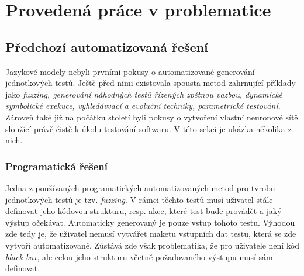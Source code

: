 \documentclass[czech, ma, kiv, he, iso690alph, pdf, viewonly]{fasthesis}
\begin{document}
    \section{Provedená práce v problematice} \label{sec:previouswork}
        \subsection{Předchozí automatizovaná řešení}
        Jazykové modely nebyli prvními pokusy o automatizované generování jednotkových testů. Ještě před nimi existovala spousta metod zahrnující příklady jako \textit{fuzzing, generování náhodných testů řízených zpětnou vazbou, dynamické symbolické exekuce, vyhledávvací a evoluční techniky, parametrické testování}. Zároveň také již na počátku století byli pokusy o vytvoření vlastní neuronové sítě sloužící právě čistě k úkolu testování softwaru. V této sekci je ukázka několika z nich. 


        \subsubsection{Programatická řešení}
        Jedna z používaných programatických automatizovaných metod pro tvrobu jednotkových testů je tzv. \textit{fuzzing}. V rámci těchto testů musí uživatel stále definovat jeho kódovou strukturu, resp. akce, které test bude provádět a jaký výstup očekávat. Automaticky generovaný je pouze vstup tohoto testu. Výhodou zde tedy je, že uživatel nemusí vytvářet maketu vstupních dat testu, která se zde vytvoří automatizovaně. Zůstává zde však problematika, že pro uživatele není kód \emph{black-box}, ale celou jeho strukturu včetně požadovaného výstupu musí sám definovat. \cite{fuzzing}
\end{document}
